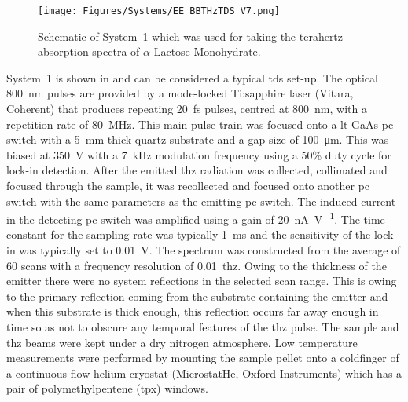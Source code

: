 \begin{figure}[h]
\centering
\texttt{[image: Figures/Systems/EE\_BBTHzTDS\_V7.png]}
\captionsetup{font = footnotesize, justification = centering}
  \caption[Schematic of System~1 which was used for taking the Terahertz Absorption Spectra of \(\alpha\)-Lactose Monohydrate]{Schematic of System~1 which was used for taking the terahertz absorption spectra of \(\alpha\)-Lactose Monohydrate.}
  \label{fig:BBTDS System}
\end{figure}

System~1 is shown in  and can be considered a typical \acrshort{tds} set\nobreakdash-up. The optical \SI{800}{nm} pulses are provided by a mode-locked Ti:sapphire laser (Vitara, Coherent) that produces repeating \SI{20}{fs} pulses, centred at \SI{800}{nm}, with a repetition rate of \SI{80}{MHz}. This main pulse train was focused onto a \acrshort{lt}\nobreakdash-GaAs \acrshort{pc} switch with a \SI{5}{mm} thick quartz substrate and a gap size of \SI{100}{\micro\metre}. This was biased at \SI{350}{V} with a \SI{7}{kHz} modulation frequency using a 50\% duty cycle for lock-in detection. After the emitted \acrshort{thz} radiation was collected, collimated and focused through the sample, it was recollected and focused onto another \acrshort{pc} switch with the same parameters as the emitting \acrshort{pc} switch. The induced current in the detecting \acrshort{pc} switch was amplified using a gain of \SI{20}{\unit{\nA.\V^{-1}}}. The time constant for the sampling rate was typically \SI{1}{ms} and the sensitivity of the lock\nobreakdash-in was typically set to \SI{0.01}{V}. The spectrum was constructed from the average of 60 scans with a frequency resolution of \SI{0.01}{\acrshort{thz}}. Owing to the thickness of the emitter there were no system reflections in the selected scan range. This is owing to the primary reflection coming from the substrate containing the emitter and when this substrate is thick enough, this reflection occurs far away enough in time so as not to obscure any temporal features of the \acrshort{thz} pulse. The sample and \acrshort{thz} beams were kept under a dry nitrogen atmosphere. Low temperature measurements were performed by mounting the sample pellet onto a coldfinger of a continuous\nobreakdash-flow helium cryostat (MicrostatHe, Oxford Instruments) which has a pair of polymethylpentene (\acrshort{tpx}) windows.

